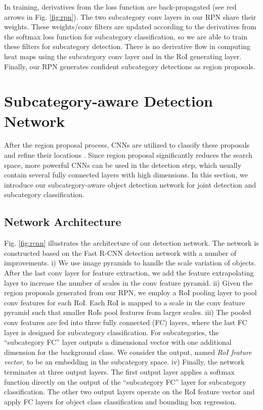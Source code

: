 \documentclass[10pt,twocolumn,letterpaper]{article}
\begin{document}
In training, derivatives from the loss function are back-propagated (see red arrows in Fig. \ref{fig:rpn}). The two subcategory conv layers in our RPN share their weights. These weights/conv filters are updated according to the derivatives from the softmax loss function for subcategory classification, so we are able to train these filters for subcategory detection. There is no derivative flow in computing heat maps using the subcategory conv layer and in the RoI generating layer. Finally, our RPN generates confident subcategory detections as region proposals.







\section{Subcategory-aware Detection Network}
\label{sec:det_net}

After the region proposal process, CNNs are utilized to classify these proposals and refine their locations \cite{girshick2013rich,girshick2015fast,ren2015faster}. Since region proposal significantly reduces the search space, more powerful CNNs can be used in the detection step, which usually contain several fully connected layers with high dimensions. In this section, we introduce our subcategory-aware object detection network for joint detection and subcategory classification.


\subsection{Network Architecture}

Fig. \ref{fig:rcnn} illustrates the architecture of our detection network. The network is constructed based on the Fast R-CNN detection network \cite{girshick2015fast} with a number of improvements. i) We use image pyramids to handle the scale variation of objects. After the last conv layer for feature extraction, we add the feature extrapolating layer to increase the number of scales in the conv feature pyramid. ii) Given the region proposals generated from our RPN, we employ a RoI pooling layer to pool conv features for each RoI. Each RoI is mapped to a scale in the conv feature pyramid such that smaller RoIs pool features from larger scales. iii) The pooled conv features are fed into three fully connected (FC) layers, where the last FC layer is designed for subcategory classification. For  subcategories, the ``subcategory FC'' layer outputs a  dimensional vector with one additional dimension for the background class. We consider the output, named \emph{RoI feature vector}, to be an embedding in the subcategory space. iv) Finally, the network terminates at three output layers. The first output layer applies a softmax function directly on the output of the ``subcategory FC'' layer for subcategory classification. The other two output layers operate on the RoI feature vector and apply FC layers for object class classification and bounding box regression. 
\end{document}
